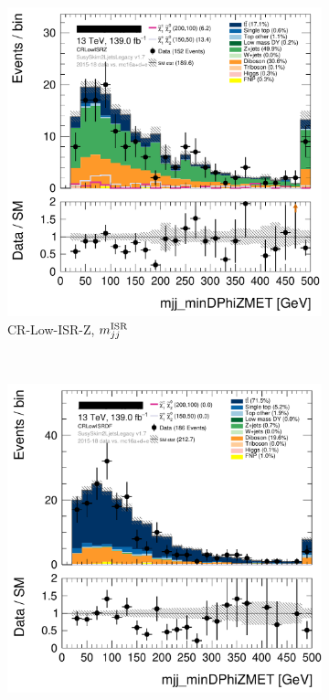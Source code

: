 \begin{figure}[tp]
\centering
\begin{subfigure}{0.62\textwidth}
\centering
\includegraphics[width=\textwidth]{figures/2ljets_vrlow_old_crlowisr_z.png}
\caption{CR-Low-ISR-Z, $m_{jj}^\mathrm{ISR}$}
\end{subfigure}
\\
\begin{subfigure}{0.62\textwidth}
\centering
\includegraphics[width=\textwidth]{figures/2ljets_vrlow_old_crlowisr_df.png}

\end{subfigure}
\end{figure}
